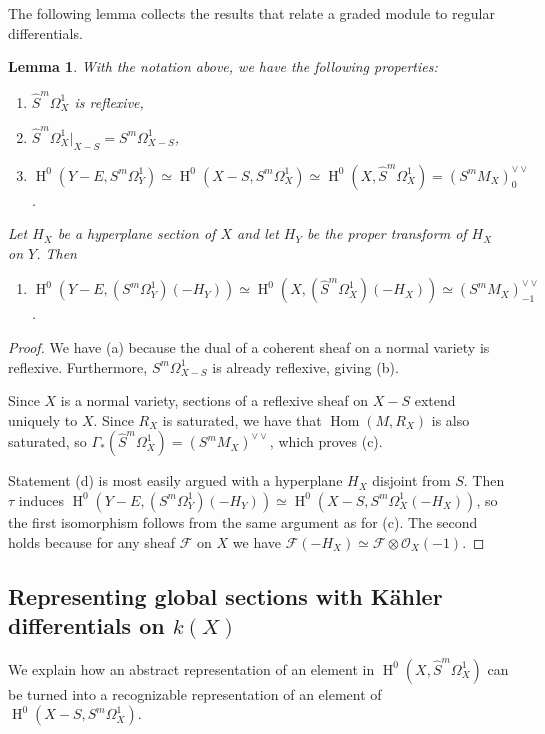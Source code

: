 \documentclass[12pt, reqno]{amsart}
\newtheorem{lemma}{Lemma}[section]
\theoremstyle{definition}
\newcommand{\sF}{{\mathscr F}}
\newcommand{\sO}{{\mathscr O}}
\DeclareMathOperator{\HH}{H}
\DeclareMathOperator{\Hom}{Hom}
\numberwithin{equation}{section}
\numberwithin{table}{section}
\begin{document}
The following lemma collects the results that relate a graded module to regular differentials.

\begin{lemma}\label{L:compute_sections}
	With the notation above, we have the following properties:
	\begin{enumerate}
		\item[(a)] $\hat{S}^m\Omega^1_X$ is reflexive,
		\item[(b)] $\hat{S}^m\Omega^1_X |_{X-S}=S^m\Omega^1_{X-S}$,
		\item[(c)] $\HH^0(Y- E,S^m\Omega^1_Y)\simeq \HH^0(X- S,S^m\Omega^1_X)\simeq \HH^0(X,\hat{S}^m\Omega^1_X)=(S^m M_X)^{\vee\vee}_0$.
	\end{enumerate}
    Let $H_X$ be a hyperplane section of $X$ and let $H_Y$ be the proper transform of $H_X$ on $Y$. Then
    \begin{enumerate}
    	\item[(d)] $\HH^0(Y-E,(S^m\Omega^1_Y)(-H_Y))\simeq \HH^0(X,(\hat{S}^m\Omega^1_X)(-H_X))\simeq(S^m M_X)^{\vee\vee}_{-1}$.
    \end{enumerate}
\end{lemma}
\begin{proof}
We have (a) because	the dual of a coherent sheaf on a normal variety is reflexive. Furthermore, $S^m\Omega^1_{X-S}$ is already reflexive, giving (b).

Since $X$ is a normal variety, sections of a reflexive sheaf on $X-S$ extend uniquely to $X$. Since $R_X$ is saturated, we have that $\Hom(M,R_X)$ is also saturated, so $\Gamma_*(\hat{S}^m\Omega^1_X)=(S^m M_X)^{\vee\vee}$, which proves (c).

Statement (d) is most easily argued with a hyperplane $H_X$ disjoint from $S$. Then $\tau$ induces $\HH^0(Y-E,(S^m\Omega^1_Y)(-H_Y))\simeq\HH^0(X-S,S^m\Omega^1_X(-H_X))$, so the first isomorphism follows from the same argument as for (c). The second holds because for any sheaf $\sF$ on $X$ we have $\sF(-H_X)\simeq \sF\otimes\sO_X(-1)$.
\end{proof}

\subsection{Representing global sections with K\"ahler differentials on $k(X)$}

We explain how an abstract representation of an element in $\HH^0(X,\hat{S}^m\Omega^1_X)$ can be turned into a recognizable representation of an element of $\HH^0(X- S,{S}^m\Omega_X^1)$.
\end{document}
